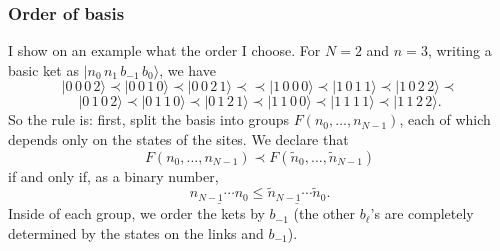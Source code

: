 \subsubsection{Order of basis}
I show on an example what the order I choose. For $N=2$ and $n=3$, writing a basic ket as $|n_0\, n_1\, b_{-1}\, b_0\rangle$, we have
\[
|0\, 0\, 0\, 2\rangle \prec |0\, 0\, 1\, 0\rangle \prec |0\, 0\, 2\, 1\rangle \prec 
\prec |1\, 0\, 0\, 0\rangle \prec |1\, 0\, 1\, 1\rangle \prec |1\, 0\, 2\, 2\rangle \prec
\]\[
 |0\, 1\, 0\, 2\rangle \prec |0\, 1\, 1\, 0\rangle \prec |0\,1\, 2\, 1\rangle \prec
|1\, 1\, 0\, 0\rangle \prec |1\, 1\, 1\, 1\rangle \prec |1\, 1\, 2\, 2\rangle.
\]
So the rule is: first, split the basis into groups $F(n_0,\ldots,n_{N-1})$, each of which depends only on the states of the sites. We declare that
\[
F(n_0,\ldots,n_{N-1}) \prec F(\tilde{n}_0,\ldots,\tilde{n}_{N-1})
\]
if and only if, as a binary number,
\[
\underline{n_{N-1}\cdots n_{0}} \leq \underline{\tilde{n}_{N-1}\cdots \tilde{n}_{0}}.
\]
Inside of each group, we order the kets by $b_{-1}$ (the other $b_{\ell}$'s are completely determined by the states on the links and $b_{-1}$).

